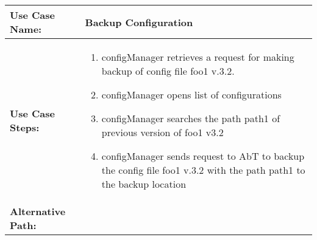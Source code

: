 
\begin{tabularx}{\linewidth}{|l|X|}
\hline
\textbf{Use Case Name:} & \textbf{Backup Configuration} \\
\hline
\textbf{Use Case Steps:} & 
\begin{minipage}{\linewidth} 
  \vspace{0.05em}
  \begin{enumerate}
	\item configManager retrieves a request for making backup of config file foo1 v.3.2.
	\item configManager opens list of configurations
	\item configManager searches the path path1 of previous version of foo1 v3.2
	\item configManager sends request to AbT to backup the config file foo1 v.3.2 with the path path1 to the backup location
  \end{enumerate}
  \vspace{0.05em}
\end{minipage}
\\
\hline 
\textbf{Alternative Path:} &
\begin{minipage}{\linewidth}
  \vspace{0.05em} 
  \vspace{0.05em} 
\end{minipage}
\\
\hline
\end{tabularx}


